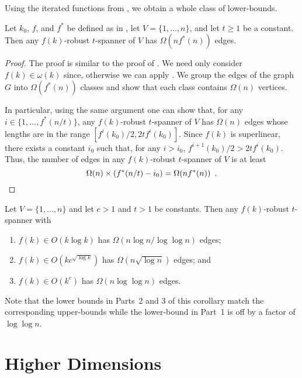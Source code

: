 \documentclass{patmorin}
\begin{document}
Using the iterated functions from , we obtain a whole
class of lower-bounds.

\begin{thm}
  Let $k_0$, $f$, and $f^*$ be defined as in ,
  let $V=\{1,\ldots,n\}$, and let $t\ge 1$ be a constant.  Then any
  $f(k)$-robust $t$-spanner of $V$ has $\Omega(nf^*(n))$ edges.
\end{thm}

\begin{proof}
  The proof is similar to the proof of .
  We need only consider $f(k)\in\omega(k)$ since, otherwise we can apply
  .  We group the edges of the graph
  $G$ into $\Omega(f^*(n))$ classes and show that each class contains
  $\Omega(n)$ vertices.  

  In particular, using the same argument one can show that, for
  any $i\in\{1,\ldots,f^*(n/t)\}$, any $f(k)$-robust $t$-spanner
  of $V$ has $\Omega(n)$ edges whose lengths are in the range
  $[f^i(k_0)/2,2tf^i(k_0)]$.  Since $f(k)$ is superlinear, there exists
  a constant $i_0$ such that, for any $i>i_0$, $f^{i+1}(k_0)/2 > 2tf^i(k_0)$.
  Thus, the number of edges in any $f(k)$-robust $t$-spanner of $V$ is at least
  \[  \Omega(n) \times (f^*(n/t)-i_0) = \Omega(n f^*(n)) \enspace . \qedhere \]
\end{proof}

\begin{cor}
  Let $V=\{1,\ldots,n\}$ and let $c>1$ and $t>1$ be constants.  Then any
  $f(k)$-robust $t$-spanner with
  \begin{enumerate}
    \item $f(k)\in O(k\log k)$ has $\Omega(n\log n/\log\log n)$ edges;
    \item $f(k)\in O(kc^{\sqrt{\log k}})$ has $\Omega(n\sqrt{\log n})$
      edges; and
    \item $f(k)\in O(k^{c})$ has $\Omega(n\log\log n)$ edges.
  \end{enumerate}
\end{cor}

Note that the lower bounds in Parts~2 and 3 of this corollary match the
corresponding upper-bounds while the lower-bound in Part~1 is off by a
factor of $\log\log n$.


\section{Higher Dimensions}
\end{document}

